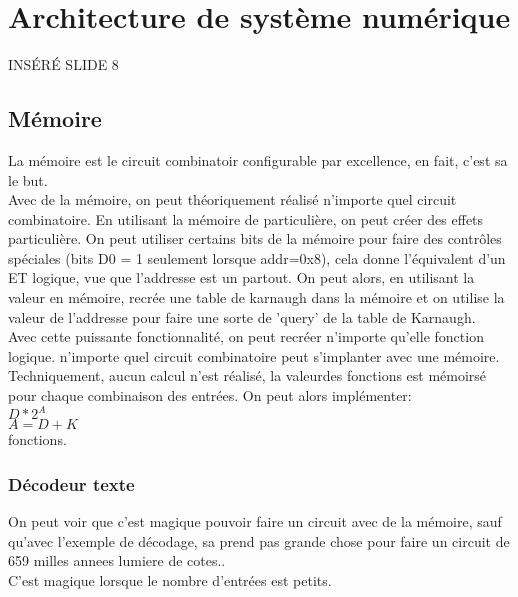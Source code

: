 \documentclass[oneside]{book}
\begin{document}
        \section{Architecture de système numérique}
        INSÉRÉ SLIDE 8\\
        
        \subsection{Mémoire}
        La mémoire est le circuit combinatoir configurable par excellence, en fait, c'est sa le but.\\
        
        Avec de la mémoire, on peut théoriquement réalisé n'importe quel circuit combinatoire. En utilisant la mémoire de particulière, on peut créer des effets particulière. On peut utiliser certains bits de la mémoire pour faire des contrôles spéciales (bits D0 = 1 seulement lorsque addr=0x8), cela donne l'équivalent d'un ET logique, vue que l'addresse est un partout. On peut alors, en utilisant la valeur en mémoire, recrée une table de karnaugh dans la mémoire et on utilise la valeur de l'addresse pour faire une sorte de 'query' de la table de Karnaugh.\\
        
        Avec cette puissante fonctionnalité, on peut recréer n'importe qu'elle fonction logique. n'importe quel circuit combinatoire peut s'implanter avec une mémoire.\\
        
        Techniquement, aucun calcul n'est réalisé, la valeurdes fonctions est mémoirsé pour chaque combinaison des entrées. On peut alors implémenter:\\
        $D * 2^A$\\
        $A = D + K$\\
        
        fonctions.\\
        
        \subsubsection{Décodeur texte}
        On peut voir que c'est magique pouvoir faire un circuit avec de la mémoire, sauf qu'avec l'exemple de décodage, sa prend pas grande chose pour faire un circuit de 659 milles annees lumiere de cotes..\\
        
        C'est magique lorsque le nombre d'entrées est petits.\\
        
\end{document}
